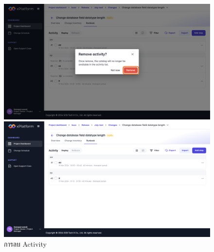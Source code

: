 \begin{figure}[H]
\begin{center}
    \includegraphics[width=\linewidth]{resources/pages/change-runbook/delete-activity/43.png}

    \vspace{1in}

    \includegraphics[width=\linewidth]{resources/pages/change-runbook/delete-activity/44.png}
\end{center}
\caption[การลบ Activity]{การลบ Activity}
\label{fig:delete-activity}
\end{figure}

\newpage
